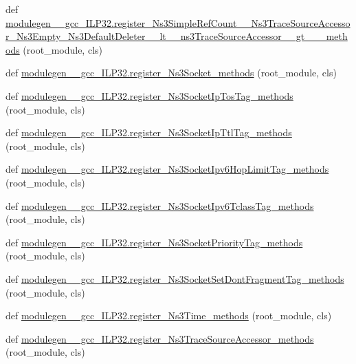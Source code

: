 \begin{DoxyCompactItemize}
\item 
def \hyperlink{namespacemodulegen____gcc__ILP32_a54ea4c3c62de90cf295c66cffbc336c8}{modulegen\+\_\+\+\_\+gcc\+\_\+\+I\+L\+P32.\+register\+\_\+\+Ns3\+Simple\+Ref\+Count\+\_\+\+\_\+\+Ns3\+Trace\+Source\+Accessor\+\_\+\+Ns3\+Empty\+\_\+\+Ns3\+Default\+Deleter\+\_\+\+\_\+lt\+\_\+\+\_\+ns3\+Trace\+Source\+Accessor\+\_\+\+\_\+gt\+\_\+\+\_\+\+\_\+methods} (root\+\_\+module, cls)
\item 
def \hyperlink{namespacemodulegen____gcc__ILP32_a8ce744b0ab962d945946183e651a1093}{modulegen\+\_\+\+\_\+gcc\+\_\+\+I\+L\+P32.\+register\+\_\+\+Ns3\+Socket\+\_\+methods} (root\+\_\+module, cls)
\item 
def \hyperlink{namespacemodulegen____gcc__ILP32_a1d60ddfb175255b5ce871317d24a10a0}{modulegen\+\_\+\+\_\+gcc\+\_\+\+I\+L\+P32.\+register\+\_\+\+Ns3\+Socket\+Ip\+Tos\+Tag\+\_\+methods} (root\+\_\+module, cls)
\item 
def \hyperlink{namespacemodulegen____gcc__ILP32_a9cff31572b2259709e940d9e2855c9ab}{modulegen\+\_\+\+\_\+gcc\+\_\+\+I\+L\+P32.\+register\+\_\+\+Ns3\+Socket\+Ip\+Ttl\+Tag\+\_\+methods} (root\+\_\+module, cls)
\item 
def \hyperlink{namespacemodulegen____gcc__ILP32_a08d0087ff2c10e0c1bee2561ebe9367b}{modulegen\+\_\+\+\_\+gcc\+\_\+\+I\+L\+P32.\+register\+\_\+\+Ns3\+Socket\+Ipv6\+Hop\+Limit\+Tag\+\_\+methods} (root\+\_\+module, cls)
\item 
def \hyperlink{namespacemodulegen____gcc__ILP32_aeaf274b2ff8afd19c5171f66e6813a49}{modulegen\+\_\+\+\_\+gcc\+\_\+\+I\+L\+P32.\+register\+\_\+\+Ns3\+Socket\+Ipv6\+Tclass\+Tag\+\_\+methods} (root\+\_\+module, cls)
\item 
def \hyperlink{namespacemodulegen____gcc__ILP32_ad1400349f5484561618e7daf55e8db46}{modulegen\+\_\+\+\_\+gcc\+\_\+\+I\+L\+P32.\+register\+\_\+\+Ns3\+Socket\+Priority\+Tag\+\_\+methods} (root\+\_\+module, cls)
\item 
def \hyperlink{namespacemodulegen____gcc__ILP32_aab7d3f70a48bea520a622e02343abfc9}{modulegen\+\_\+\+\_\+gcc\+\_\+\+I\+L\+P32.\+register\+\_\+\+Ns3\+Socket\+Set\+Dont\+Fragment\+Tag\+\_\+methods} (root\+\_\+module, cls)
\item 
def \hyperlink{namespacemodulegen____gcc__ILP32_a4bcbbf479533e8b6fb238739668fe36d}{modulegen\+\_\+\+\_\+gcc\+\_\+\+I\+L\+P32.\+register\+\_\+\+Ns3\+Time\+\_\+methods} (root\+\_\+module, cls)
\item 
def \hyperlink{namespacemodulegen____gcc__ILP32_a3451d08858386f1fa04131d165c83ba0}{modulegen\+\_\+\+\_\+gcc\+\_\+\+I\+L\+P32.\+register\+\_\+\+Ns3\+Trace\+Source\+Accessor\+\_\+methods} (root\+\_\+module, cls)

\end{DoxyCompactItemize}
